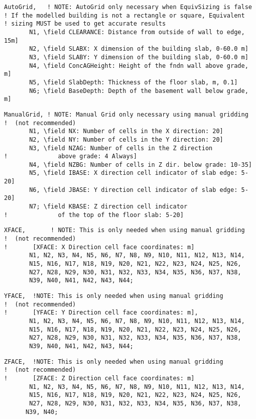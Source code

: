 \begin{lstlisting}
AutoGrid,   ! NOTE: AutoGrid only necessary when EquivSizing is false
! If the modelled building is not a rectangle or square, Equivalent
! sizing MUST be used to get accurate results
       N1, \field CLEARANCE: Distance from outside of wall to edge, 15m]
       N2, \field SLABX: X dimension of the building slab, 0-60.0 m]
       N3, \field SLABY: Y dimension of the building slab, 0-60.0 m]
       N4, \field ConcAGHeight: Height of the fndn wall above grade, m]
       N5, \field SlabDepth: Thickness of the floor slab, m, 0.1]
       N6; \field BaseDepth: Depth of the basement wall below grade, m]
\end{lstlisting}

\begin{lstlisting}
ManualGrid, ! NOTE: Manual Grid only necessary using manual gridding
!  (not recommended)
       N1, \field NX: Number of cells in the X direction: 20]
       N2, \field NY: Number of cells in the Y direction: 20]
       N3, \field NZAG: Number of cells in the Z direction
!              above grade: 4 Always]
       N4, \field NZBG: Number of cells in Z dir. below grade: 10-35]
       N5, \field IBASE: X direction cell indicator of slab edge: 5-20]
       N6, \field JBASE: Y direction cell indicator of slab edge: 5-20]
       N7; \field KBASE: Z direction cell indicator
!              of the top of the floor slab: 5-20]
\end{lstlisting}

\begin{lstlisting}
XFACE,       ! NOTE: This is only needed when using manual gridding
!  (not recommended)
!       [XFACE: X Direction cell face coordinates: m]
       N1, N2, N3, N4, N5, N6, N7, N8, N9, N10, N11, N12, N13, N14,
       N15, N16, N17, N18, N19, N20, N21, N22, N23, N24, N25, N26,
       N27, N28, N29, N30, N31, N32, N33, N34, N35, N36, N37, N38,
       N39, N40, N41, N42, N43, N44;
\end{lstlisting}

\begin{lstlisting}
YFACE,  !NOTE: This is only needed when using manual gridding
!  (not recommended)
!       [YFACE: Y Direction cell face coordinates: m],
       N1, N2, N3, N4, N5, N6, N7, N8, N9, N10, N11, N12, N13, N14,
       N15, N16, N17, N18, N19, N20, N21, N22, N23, N24, N25, N26,
       N27, N28, N29, N30, N31, N32, N33, N34, N35, N36, N37, N38,
       N39, N40, N41, N42, N43, N44;
\end{lstlisting}

\begin{lstlisting}
ZFACE,  !NOTE: This is only needed when using manual gridding
!  (not recommended)
!       [ZFACE: Z Direction cell face coordinates: m]
       N1, N2, N3, N4, N5, N6, N7, N8, N9, N10, N11, N12, N13, N14,
       N15, N16, N17, N18, N19, N20, N21, N22, N23, N24, N25, N26,
       N27, N28, N29, N30, N31, N32, N33, N34, N35, N36, N37, N38,
      N39, N40;
\end{lstlisting}
